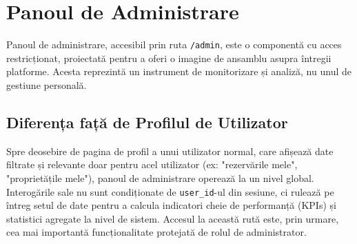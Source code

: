 \documentclass[12pt, a4paper, oneside, romanian]{teza-upb}
\begin{document}
\section{Panoul de Administrare}
Panoul de administrare, accesibil prin ruta \texttt{/admin}, este o componentă cu acces restricționat, proiectată pentru a oferi o imagine de ansamblu asupra întregii platforme. Acesta reprezintă un instrument de monitorizare și analiză, nu unul de gestiune personală.

\subsection*{Diferența față de Profilul de Utilizator}
Spre deosebire de pagina de profil a unui utilizator normal, care afișează date filtrate și relevante doar pentru acel utilizator (ex: "rezervările mele", "proprietățile mele"), panoul de administrare operează la un nivel global. Interogările sale nu sunt condiționate de \texttt{user\_id}-ul din sesiune, ci rulează pe întreg setul de date pentru a calcula indicatori cheie de performanță (KPIs) și statistici agregate la nivel de sistem. Accesul la această rută este, prin urmare, cea mai importantă funcționalitate protejată de rolul de administrator.
\end{document}
